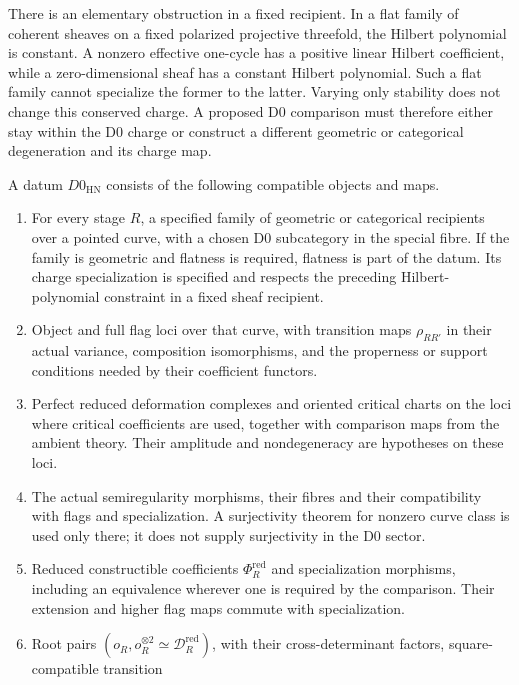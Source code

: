 There is an elementary obstruction in a fixed recipient. In a flat
family of coherent sheaves on a fixed polarized projective
threefold, the Hilbert polynomial is constant. A nonzero effective
one-cycle has a positive linear Hilbert coefficient, while a
zero-dimensional sheaf has a constant Hilbert polynomial. Such a
flat family cannot specialize the former to the latter. Varying
only stability does not change this conserved charge. A proposed
D0 comparison must therefore either stay within the D0 charge or
construct a different geometric or categorical degeneration and
its charge map.

\begin{definition}
\label{def:G-D0-HN-system}
A datum \(D0_{\mathrm{HN}}\) consists of the following compatible
objects and maps.
\begin{enumerate}
\item[\textup{(D0.1)}] For every stage \(R\), a specified family of
geometric or categorical recipients over a pointed curve, with a
chosen D0 subcategory in the special fibre. If the family is
geometric and flatness is required, flatness is part of the datum.
Its charge specialization is specified and respects the preceding
Hilbert-polynomial constraint in a fixed sheaf recipient.
\item[\textup{(D0.2)}] Object and full flag loci over that curve,
with transition maps \(\rho_{RR'}\) in their actual variance,
composition isomorphisms, and the properness or support conditions
needed by their coefficient functors.
\item[\textup{(D0.3)}] Perfect reduced deformation complexes and
oriented critical charts on the loci where critical coefficients
are used, together with comparison maps from the ambient theory.
Their amplitude and nondegeneracy are hypotheses on these loci.
\item[\textup{(D0.4)}] The actual semiregularity morphisms, their
fibres and their compatibility with flags and specialization.
A surjectivity theorem for nonzero curve class is used only there;
it does not supply surjectivity in the D0 sector.
\item[\textup{(D0.5)}] Reduced constructible coefficients
\(\Phi_R^{\mathrm{red}}\) and specialization morphisms, including
an equivalence wherever one is required by the comparison.
Their extension and higher flag maps commute with specialization.
\item[\textup{(D0.6)}] Root pairs
\((o_R,o_R^{\otimes2}\simeq\mathscr D_R^{\mathrm{red}})\),
with their cross-determinant factors, square-compatible transition

\end{enumerate}
\end{definition}
